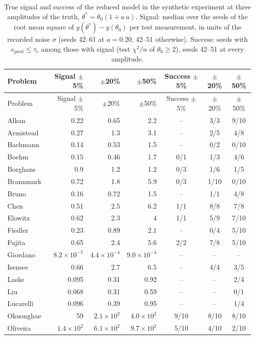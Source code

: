 \begin{longtable}{@{}lrrrccc@{}}
\caption{True signal and success of the reduced model in the synthetic experiment at three amplitudes of the truth, $\theta^\ast=\theta_0(1+a\,u)$. Signal: median over the seeds of the root mean square of $y(\theta^\ast)-y(\theta_0)$ per test measurement, in units of the recorded noise $\sigma$ (seeds 42--61 at $a=0.20$, 42--51 otherwise). Success: seeds with $e_{\mathrm{pred}}\le\tau_e$ among those with signal (test $\chi^2/n$ of $\theta_0\ge2$), seeds 42--51 at every amplitude.}\label{tab:signal}\\
\toprule
Problem & Signal $\pm$5\% & $\pm$20\% & $\pm$50\% & Success $\pm$5\% & $\pm$20\% & $\pm$50\% \\
\midrule
\endfirsthead
\toprule
Problem & Signal $\pm$5\% & $\pm$20\% & $\pm$50\% & Success $\pm$5\% & $\pm$20\% & $\pm$50\% \\
\midrule
\endhead
Alkan & 0.22 & 0.65 & 2.2 & -- & 3/3 & 9/10 \\
Armistead & 0.27 & 1.3 & 3.1 & -- & 2/5 & 4/8 \\
Bachmann & 0.14 & 0.53 & 1.5 & -- & 0/2 & 0/10 \\
Boehm & 0.15 & 0.46 & 1.7 & 0/1 & 1/3 & 4/6 \\
Borghans & 0.9 & 1.2 & 1.2 & 0/3 & 1/6 & 1/5 \\
Brannmark & 0.72 & 1.8 & 5.9 & 0/3 & 1/10 & 0/10 \\
Bruno & 0.16 & 0.72 & 1.5 & -- & 1/1 & 4/8 \\
Chen & 0.51 & 2.5 & 6.2 & 1/1 & 8/8 & 7/8 \\
Elowitz & 0.62 & 2.3 & 4 & 1/1 & 5/9 & 7/10 \\
Fiedler & 0.23 & 0.89 & 2.1 & -- & 0/4 & 5/10 \\
Fujita & 0.65 & 2.4 & 5.6 & 2/2 & 7/8 & 5/10 \\
Giordano & $8.2\times10^{-5}$ & $4.4\times10^{-4}$ & $9.0\times10^{-4}$ & -- & -- & -- \\
Isensee & 0.66 & 2.7 & 6.5 & -- & 4/4 & 3/5 \\
Laske & 0.095 & 0.31 & 0.92 & -- & -- & 2/4 \\
Liu & 0.068 & 0.31 & 0.59 & -- & -- & 0/1 \\
Lucarelli & 0.096 & 0.39 & 0.95 & -- & -- & 1/4 \\
Okuonghae & 59 & $2.1\times10^{2}$ & $4.0\times10^{2}$ & 9/10 & 8/10 & 8/10 \\
Oliveira & $1.4\times10^{2}$ & $6.1\times10^{2}$ & $9.7\times10^{2}$ & 5/10 & 4/10 & 2/10 \\

\end{longtable}
